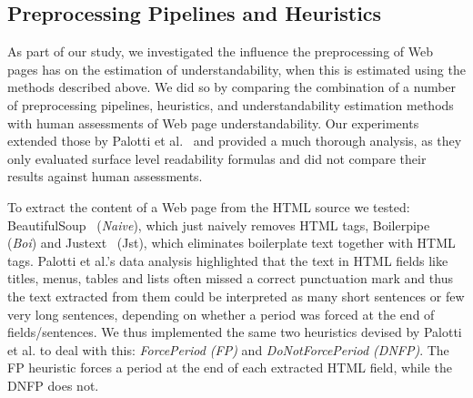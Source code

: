 


\subsection{Preprocessing Pipelines and Heuristics}
\label{sec:pipelines}

As part of our study, we investigated the influence the preprocessing of Web pages has on the estimation of understandability, when this is estimated using the methods described above.
We did so by comparing the combination of a number of preprocessing pipelines, heuristics, and understandability estimation methods with human assessments of Web page understandability. 
Our experiments extended those by Palotti et al.~\cite{palotti15} and provided a much thorough analysis, as they only evaluated surface level readability formulas and did not compare their results against human assessments. 

To extract the content of a Web page from the HTML source we tested: BeautifulSoup~\cite{bs4} (\textit{Naive}), which just naively removes HTML tags, Boilerpipe~\cite{kohlschutter10} (\textit{Boi}) and Justext~\cite{jan11} ({Jst}), which eliminates boilerplate text together with HTML tags. 
Palotti et al.'s data analysis highlighted that the text in HTML fields like titles, menus, tables and lists often missed a correct punctuation mark and thus the text extracted from them could be interpreted as many short sentences or few very long sentences, depending on whether a period was forced at the end of fields/sentences. We thus implemented the same two heuristics devised by Palotti et al. to deal with this: \textit{ForcePeriod (FP)} and \textit{DoNotForcePeriod (DNFP)}. The FP heuristic forces a period at the end of each extracted HTML field, while the DNFP does not. 


